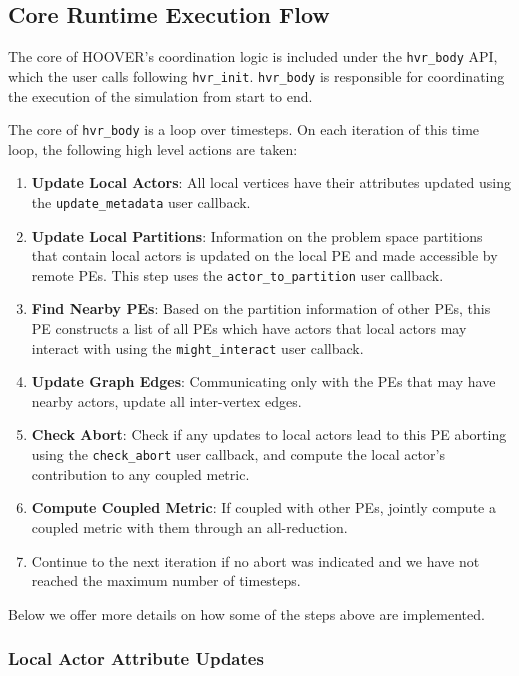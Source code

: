 \subsection{Core Runtime Execution Flow}

The core of HOOVER's coordination logic is included under the \texttt{hvr\_body}
API, which the user calls following \texttt{hvr\_init}. \texttt{hvr\_body} is
responsible for coordinating the execution of the simulation from start to end.

The core of \texttt{hvr\_body} is a loop over timesteps. On each iteration of
this time loop, the following high level actions are taken:

\begin{enumerate}
    \item \textbf{Update Local Actors}: All local vertices have their attributes updated using the
        \texttt{update\_metadata} user callback.
    \item \textbf{Update Local Partitions}: Information on the problem space partitions that contain local actors
        is updated on the local PE and made accessible by remote PEs. This step
        uses the \texttt{actor\_to\_partition} user callback.
    \item \textbf{Find Nearby PEs}: Based on the partition information of other PEs, this PE constructs a
        list of all PEs which have actors that local actors may interact with
        using the \texttt{might\_interact} user callback.
    \item \textbf{Update Graph Edges}: Communicating only with the PEs that may have nearby actors, update
        all inter-vertex edges.
    \item \textbf{Check Abort}: Check if any updates to local actors lead to this PE aborting using
        the \texttt{check\_abort} user callback, and compute the local actor's
        contribution to any coupled metric.
    \item \textbf{Compute Coupled Metric}: If coupled with other PEs, jointly compute a coupled metric with them
        through an all-reduction.
    \item Continue to the next iteration if no abort was indicated and we have
        not reached the maximum number of timesteps.
\end{enumerate}

Below we offer more details on how some of the steps above are implemented.

\subsubsection{Local Actor Attribute Updates}

